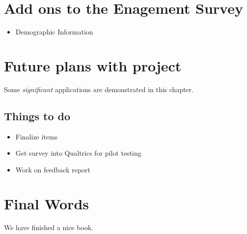 \documentclass[
]{book}
\providecommand{\tightlist}{%
  \setlength{\itemsep}{0pt}\setlength{\parskip}{0pt}}
\begin{document}
\hypertarget{add-ons-to-the-enagement-survey}{%
\chapter{Add ons to the Enagement Survey}\label{add-ons-to-the-enagement-survey}}

\begin{itemize}
\tightlist
\item
  Demographic Information
\end{itemize}

\hypertarget{future-plans-with-project}{%
\chapter{Future plans with project}\label{future-plans-with-project}}

Some \emph{significant} applications are demonstrated in this chapter.

\hypertarget{things-to-do}{%
\section{Things to do}\label{things-to-do}}

\begin{itemize}
\tightlist
\item
  Finalize items
\item
  Get survey into Qualtrics for pilot testing
\item
  Work on feedback report
\end{itemize}

\hypertarget{final-words}{%
\chapter{Final Words}\label{final-words}}

We have finished a nice book.

  
\end{document}
